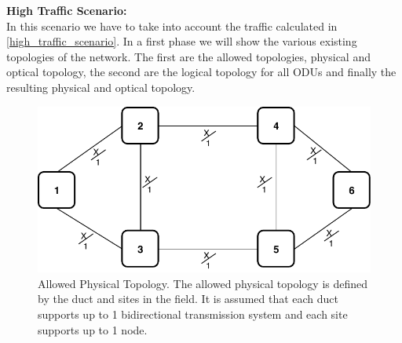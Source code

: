 \newpage
\textbf{High Traffic Scenario:}\\

In this scenario we have to take into account the traffic calculated in \ref{high_traffic_scenario}. In a first phase we will show the various existing topologies of the network. The first are the allowed topologies, physical and optical topology, the second are the logical topology for all ODUs and finally the resulting physical and optical topology.

\begin{figure}[h!]
\centering
\includegraphics[width=12cm]{sdf/ilp/opaque_protection/figures/allowed_physical_topology}
\caption{Allowed Physical Topology. The allowed physical topology is defined by the duct and sites in the field. It is assumed that each duct supports up to 1 bidirectional transmission system and each site supports up to 1 node.}
\label{allowed_physical_protectionhigh}
\end{figure}


